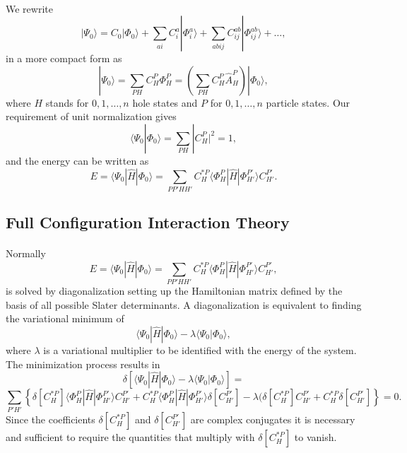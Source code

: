 \documentclass[%
oneside,                 %
final,                   %
10pt]{article}
\begin{document}
\paragraph{}
We rewrite 
\[
|\Psi_0\rangle=C_0|\Phi_0\rangle+\sum_{ai}C_i^a|\Phi_i^a\rangle+\sum_{abij}C_{ij}^{ab}|\Phi_{ij}^{ab}\rangle+\dots,
\]
in a more compact form as 
\[
|\Psi_0\rangle=\sum_{PH}C_H^P\Phi_H^P=\left(\sum_{PH}C_H^P\hat{A}_H^P\right)|\Phi_0\rangle,
\]
where $H$ stands for $0,1,\dots,n$ hole states and $P$ for $0,1,\dots,n$ particle states. 
Our requirement of unit normalization gives
\[
\langle \Psi_0 | \Phi_0 \rangle = \sum_{PH}|C_H^P|^2= 1,
\]
and the energy can be written as 
\[
E= \langle \Psi_0 | \hat{H} |\Phi_0 \rangle= \sum_{PP'HH'}C_H^{*P}\langle \Phi_H^P | \hat{H} |\Phi_{H'}^{P'} \rangle C_{H'}^{P'}.
\]



\subsection*{Full Configuration Interaction Theory}

\paragraph{}
Normally 
\[
E= \langle \Psi_0 | \hat{H} |\Phi_0 \rangle= \sum_{PP'HH'}C_H^{*P}\langle \Phi_H^P | \hat{H} |\Phi_{H'}^{P'} \rangle C_{H'}^{P'},
\]
is solved by diagonalization setting up the Hamiltonian matrix defined by the basis of all possible Slater determinants. A diagonalization
is equivalent to finding the variational minimum   of 
\[
 \langle \Psi_0 | \hat{H} |\Phi_0 \rangle-\lambda \langle \Psi_0 |\Phi_0 \rangle,
\]
where $\lambda$ is a variational multiplier to be identified with the energy of the system.
The minimization process results in 
\[
\delta\left[ \langle \Psi_0 | \hat{H} |\Phi_0 \rangle-\lambda \langle \Psi_0 |\Phi_0 \rangle\right]=
\]
\[
\sum_{P'H'}\left\{\delta[C_H^{*P}]\langle \Phi_H^P | \hat{H} |\Phi_{H'}^{P'} \rangle C_{H'}^{P'}+
C_H^{*P}\langle \Phi_H^P | \hat{H} |\Phi_{H'}^{P'} \rangle \delta[C_{H'}^{P'}]-
\lambda( \delta[C_H^{*P}]C_{H'}^{P'}+C_H^{*P}\delta[C_{H'}^{P'}]\right\} = 0.
\]
Since the coefficients $\delta[C_H^{*P}]$ and $\delta[C_{H'}^{P'}]$ are complex conjugates it is necessary and sufficient to require the quantities that multiply with $\delta[C_H^{*P}]$ to vanish.
\end{document}

